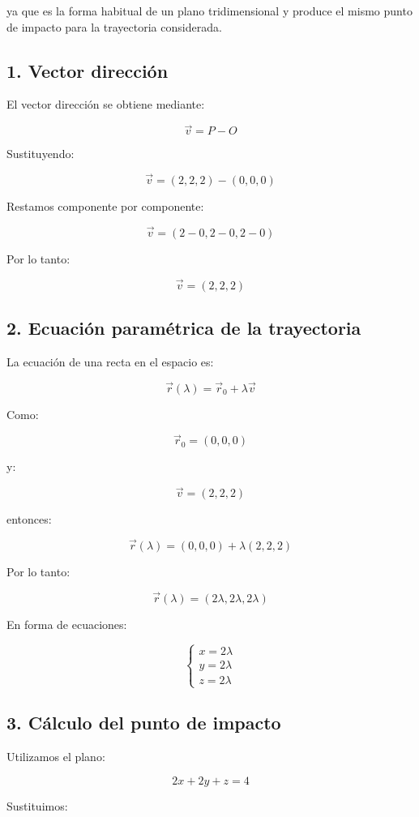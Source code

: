 \documentclass[12pt,a4paper]{article}
\begin{document}
ya que es la forma habitual de un plano tridimensional y produce
el mismo punto de impacto para la trayectoria considerada.


\subsection{1. Vector dirección}

El vector dirección se obtiene mediante:

\[\vec{v}=P-O\]

Sustituyendo:

\[\vec{v}=(2,2,2)-(0,0,0)\]

Restamos componente por componente:

\[\vec{v}=(2-0,2-0,2-0)\]

Por lo tanto:

\[\boxed{\vec{v}=(2,2,2)}\]

\subsection{2. Ecuación paramétrica de la trayectoria}

La ecuación de una recta en el espacio es:

\[\vec{r}(\lambda)=\vec{r}_0+\lambda\vec{v}\]

Como:

\[\vec{r}_0=(0,0,0)\]

y:

\[\vec{v}=(2,2,2)\]

entonces:

\[\vec{r}(\lambda)=(0,0,0)+\lambda(2,2,2)\]

Por lo tanto:

\[\boxed{\vec{r}(\lambda)=(2\lambda,2\lambda,2\lambda)}\]

En forma de ecuaciones:

\[\boxed{
\begin{cases}
x=2\lambda\\
y=2\lambda\\
z=2\lambda
\end{cases}
}
\]


\subsection{3. Cálculo del punto de impacto}

Utilizamos el plano:

\[2x+2y+z=4\]

Sustituimos:
\end{document}
